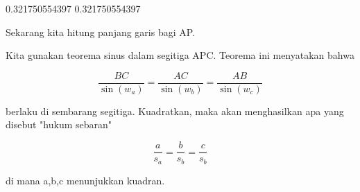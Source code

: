\documentclass[a4paper,10pt]{article}
\begin{document}
\begin{eulernotebook}
\begin{eulercomment}
\begin{eulercomment}
\begin{eulercomment}
\begin{eulercomment}
\begin{eulercomment}
\begin{eulercomment}
\begin{eulercomment}
\begin{eulercomment}
\begin{eulercomment}
\begin{eulercomment}
\begin{eulercomment}
\begin{eulercomment}
\begin{eulercomment}
\begin{eulercomment}
\begin{eulercomment}
\begin{eulercomment}
\begin{eulercomment}
\begin{eulercomment}
\begin{eulercomment}
\begin{eulercomment}
\begin{eulercomment}
\begin{eulercomment}
\begin{eulercomment}
\begin{eulercomment}
\begin{eulercomment}
\begin{eulercomment}
\begin{eulercomment}
\begin{eulercomment}
\begin{eulercomment}
\begin{eulercomment}
\begin{eulerprompt}
\end{eulerprompt}
\begin{euleroutput}
  0.321750554397
  0.321750554397
\end{euleroutput}
\begin{eulercomment}
Sekarang kita hitung panjang garis bagi AP.

Kita gunakan teorema sinus dalam segitiga APC. Teorema ini menyatakan
bahwa

\end{eulercomment}
\begin{eulerformula}
\[
\frac{BC}{\sin(w_a)} = \frac{AC}{\sin(w_b)} = \frac{AB}{\sin(w_c)}
\]
\end{eulerformula}
\begin{eulercomment}
berlaku di sembarang segitiga. Kuadratkan, maka akan menghasilkan apa
yang disebut "hukum sebaran"

\end{eulercomment}
\begin{eulerformula}
\[
\frac{a}{s_a} = \frac{b}{s_b} = \frac{c}{s_b}
\]
\end{eulerformula}
\begin{eulercomment}
di mana a,b,c menunjukkan kuadran.


\end{eulercomment}
\end{eulercomment}
\end{eulercomment}
\end{eulercomment}
\end{eulercomment}
\end{eulercomment}
\end{eulercomment}
\end{eulercomment}
\end{eulercomment}
\end{eulercomment}
\end{eulercomment}
\end{eulercomment}
\end{eulercomment}
\end{eulercomment}
\end{eulercomment}
\end{eulercomment}
\end{eulercomment}
\end{eulercomment}
\end{eulercomment}
\end{eulercomment}
\end{eulercomment}
\end{eulercomment}
\end{eulercomment}
\end{eulercomment}
\end{eulercomment}
\end{eulercomment}
\end{eulercomment}
\end{eulercomment}
\end{eulercomment}
\end{eulercomment}
\end{eulercomment}
\end{eulernotebook}
\end{document}
